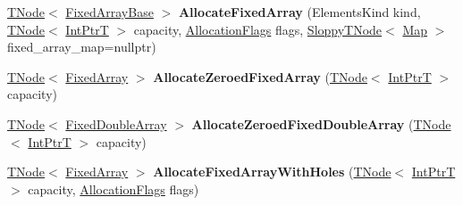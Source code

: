 \begin{DoxyCompactItemize}
\mbox{\hyperlink{classv8_1_1internal_1_1compiler_1_1TNode}{T\+Node}}$<$ \mbox{\hyperlink{classv8_1_1internal_1_1FixedArrayBase}{Fixed\+Array\+Base}} $>$ {\bfseries Allocate\+Fixed\+Array} (Elements\+Kind kind, \mbox{\hyperlink{classv8_1_1internal_1_1compiler_1_1TNode}{T\+Node}}$<$ \mbox{\hyperlink{structv8_1_1internal_1_1IntPtrT}{Int\+PtrT}} $>$ capacity, \mbox{\hyperlink{classv8_1_1base_1_1Flags}{Allocation\+Flags}} flags, \mbox{\hyperlink{classv8_1_1internal_1_1compiler_1_1SloppyTNode}{Sloppy\+T\+Node}}$<$ \mbox{\hyperlink{classv8_1_1internal_1_1Map}{Map}} $>$ fixed\+\_\+array\+\_\+map=nullptr)
\item 
\mbox{\label{classv8_1_1internal_1_1CodeStubAssembler_a188aabecdceb1696ace084adce26f117}} 
\mbox{\hyperlink{classv8_1_1internal_1_1compiler_1_1TNode}{T\+Node}}$<$ \mbox{\hyperlink{classv8_1_1internal_1_1FixedArray}{Fixed\+Array}} $>$ {\bfseries Allocate\+Zeroed\+Fixed\+Array} (\mbox{\hyperlink{classv8_1_1internal_1_1compiler_1_1TNode}{T\+Node}}$<$ \mbox{\hyperlink{structv8_1_1internal_1_1IntPtrT}{Int\+PtrT}} $>$ capacity)
\item 
\mbox{\label{classv8_1_1internal_1_1CodeStubAssembler_a61735a018d7120a65c2e97b9f9e42481}} 
\mbox{\hyperlink{classv8_1_1internal_1_1compiler_1_1TNode}{T\+Node}}$<$ \mbox{\hyperlink{classv8_1_1internal_1_1FixedDoubleArray}{Fixed\+Double\+Array}} $>$ {\bfseries Allocate\+Zeroed\+Fixed\+Double\+Array} (\mbox{\hyperlink{classv8_1_1internal_1_1compiler_1_1TNode}{T\+Node}}$<$ \mbox{\hyperlink{structv8_1_1internal_1_1IntPtrT}{Int\+PtrT}} $>$ capacity)
\item 
\mbox{\label{classv8_1_1internal_1_1CodeStubAssembler_acd6b11b02c6740aed815274d83c88439}} 
\mbox{\hyperlink{classv8_1_1internal_1_1compiler_1_1TNode}{T\+Node}}$<$ \mbox{\hyperlink{classv8_1_1internal_1_1FixedArray}{Fixed\+Array}} $>$ {\bfseries Allocate\+Fixed\+Array\+With\+Holes} (\mbox{\hyperlink{classv8_1_1internal_1_1compiler_1_1TNode}{T\+Node}}$<$ \mbox{\hyperlink{structv8_1_1internal_1_1IntPtrT}{Int\+PtrT}} $>$ capacity, \mbox{\hyperlink{classv8_1_1base_1_1Flags}{Allocation\+Flags}} flags)
\item 
\mbox{\label{classv8_1_1internal_1_1CodeStubAssembler_ae5c7eae70731c4cd16ff47609e10846b}} 

\end{DoxyCompactItemize}

